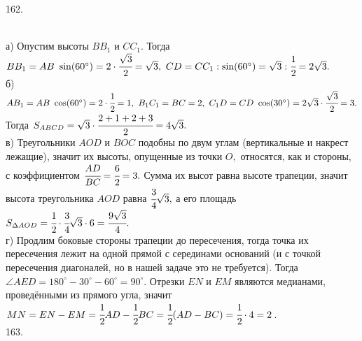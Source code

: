 \documentclass[12pt]{article}
\begin{document}
162. \begin{figure}[ht!]
\end{figure}\\
а) Опустим высоты $BB_1$ и $CC_1.$ Тогда $BB_1=AB\ \sin(60^\circ)=2\cdot \cfrac{\sqrt{3}}{2}=\sqrt{3},\ CD=CC_1:\sin(60^\circ)=\sqrt{3}:\cfrac{1}{2}=2\sqrt{3}.$\\
б) $AB_1=AB\ \cos(60^\circ)=2 \cdot \cfrac{1}{2}=1,\ B_1C_1=BC=2,\ C_1D=CD\ \cos(30^\circ)=2\sqrt{3}\cdot \cfrac{\sqrt{3}}{2}=3.$ Тогда $S_{ABCD}=\sqrt{3}\cdot\cfrac{2+1+2+3}{2}=4\sqrt{3}.$\\
в) Треугольники $AOD$ и $BOC$ подобны по двум углам (вертикальные и накрест лежащие), значит их высоты, опущенные из точки $O,$ относятся, как и стороны, с коэффициентом $\cfrac{AD}{BC}=\cfrac{6}{2}=3.$ Сумма их высот равна высоте трапеции, значит высота треугольника $AOD$ равна $\cfrac{3}{4}\sqrt{3},$ а его площадь $S_{\Delta AOD}=\cfrac{1}{2}\cdot\cfrac{3}{4}\sqrt{3}\cdot6=\cfrac{9\sqrt{3}}{4}.$\\
г) Продлим боковые стороны трапеции до пересечения, тогда точка их пересечения лежит на одной прямой с серединами оснований (и с точкой пересечения диагоналей, но в нашей задаче это не требуется). Тогда $\angle AED=180^\circ-30^\circ-60^\circ=90^\circ.$ Отрезки $EN$ и $EM$ являются медианами, проведёнными из прямого угла, значит $MN=EN-EM=\cfrac{1}{2}AD-\cfrac{1}{2}BC=\cfrac{1}{2}(AD-BC)=\cfrac{1}{2}\cdot4=2$.\\
163. \begin{figure}[ht!]
\end{figure}\\
\end{document}
